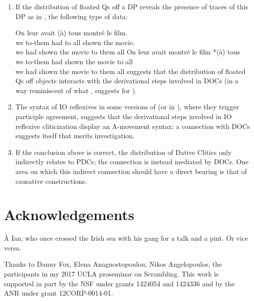\documentclass[output=paper]{langsci/langscibook}
\begin{document}
\begin{enumerate}
\item If the distribution of floated Qs off a DP reveals the presence of traces
    of this DP as in  \cite{Sportiche:1988}, the following type of data:

\ea
\ea
	\gll  On leur avait  (\`a) tous montr\'e le film.\\
    we to-them had to all shown the movie.\\
    \trans we had shown the movie to them all
\ex
	\gll On leur avait montré le film *(\`a) tous\\
    we to-them had  shown the movie to all\\
    \trans we had shown the movie to them all
\z
\z
%
suggests that the distribution of floated Qs off objects interacts with the
derivational steps involved in \glspl{DOC} (in a
way reminiscent of what \citealp{Sportiche2017c}, suggests for ).

\item The syntax of IO reflexives in some versions of  (or in ),
    where they trigger participle agreement, suggests that the derivational
    steps involved in IO reflexive cliticization display an A-movement syntax:
    a connection with  \glspl{DOC} suggests itself that merits
    investigation.

\item If the conclusion above is correct, the distribution of  Dative
    Clitics only indirectly relates to \glspl{PDC}; the connection
    is instead mediated by \glspl{DOC}. One area on which this indirect
    connection should have a direct bearing is that of causative constructions.

\end{enumerate}

\printchapterglossary{}

\section*{Acknowledgements}

\`A Ian, who once crossed the Irish sea with his gang for a talk and a pint. Or
vice versa.

Thanks to Danny Fox, Elena Anagnostopoulou, Nikos Angelopoulos, the
participants in my 2017 UCLA proseminar on Scrambling. This work is supported
in part by the NSF under grants 1424054 and 1424336 and by the ANR under grant
12CORP-0014-01.

{\sloppy
\printbibliography[heading=subbibliography,notkeyword=this]
}
\end{document}
